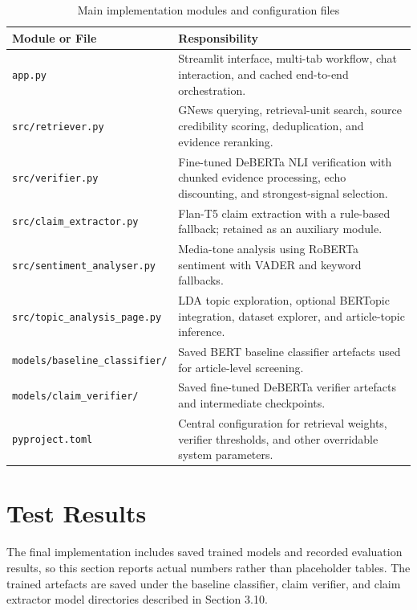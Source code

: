 \documentclass[11pt]{article}
\newcommand{\code}[1]{\texttt{#1}}
\begin{document}
\begin{table}[htbp]
    \centering
    \caption{Main implementation modules and configuration files}
    \begin{tabularx}{\textwidth}{@{}p{}Y@{}}
        \toprule
        \textbf{Module or File} & \textbf{Responsibility} \\
        \midrule
        \code{app.py} & Streamlit interface, multi-tab workflow, chat interaction, and cached end-to-end orchestration. \\
        \code{src/retriever.py} & GNews querying, retrieval-unit search, source credibility scoring, deduplication, and evidence reranking. \\
        \code{src/verifier.py} & Fine-tuned DeBERTa NLI verification with chunked evidence processing, echo discounting, and strongest-signal selection. \\
        \code{src/claim\_extractor.py} & Flan-T5 claim extraction with a rule-based fallback; retained as an auxiliary module. \\
        \code{src/sentiment\_analyser.py} & Media-tone analysis using RoBERTa sentiment with VADER and keyword fallbacks. \\
        \code{src/topic\_analysis\_page.py} & LDA topic exploration, optional BERTopic integration, dataset explorer, and article-topic inference. \\
        \code{models/baseline\_classifier/} & Saved BERT baseline classifier artefacts used for article-level screening. \\
        \code{models/claim\_verifier/} & Saved fine-tuned DeBERTa verifier artefacts and intermediate checkpoints. \\
        \code{pyproject.toml} & Central configuration for retrieval weights, verifier thresholds, and other overridable system parameters. \\
        \bottomrule
    \end{tabularx}
\end{table}

\section{Test Results}

The final implementation includes saved trained models and recorded evaluation
results, so this section reports actual numbers rather than placeholder tables.
The trained artefacts are saved under the baseline classifier, claim verifier,
and claim extractor model directories described in Section 3.10.
\end{document}
